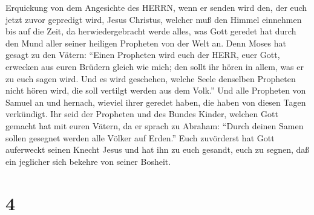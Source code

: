 Erquickung von dem Angesichte des HERRN, wenn er senden wird den, der
euch jetzt zuvor gepredigt wird, Jesus Christus,  welcher
muß den Himmel einnehmen bis auf die Zeit, da herwiedergebracht werde
alles, was Gott geredet hat durch den Mund aller seiner heiligen
Propheten von der Welt an.  Denn Moses hat gesagt zu den
Vätern: ``Einen Propheten wird euch der HERR, euer Gott, erwecken aus
euren Brüdern gleich wie mich; den sollt ihr hören in allem, was er zu
euch sagen wird.  Und es wird geschehen, welche Seele
denselben Propheten nicht hören wird, die soll vertilgt werden aus dem
Volk.''  Und alle Propheten von Samuel an und hernach,
wieviel ihrer geredet haben, die haben von diesen Tagen verkündigt.
 Ihr seid der Propheten und des Bundes Kinder, welchen Gott
gemacht hat mit euren Vätern, da er sprach zu Abraham: ``Durch deinen
Samen sollen gesegnet werden alle Völker auf Erden.''  Euch
zuvörderst hat Gott auferweckt seinen Knecht Jesus und hat ihn zu euch
gesandt, euch zu segnen, daß ein jeglicher sich bekehre von seiner
Bosheit.

\hypertarget{section-3}{%
\section{4}\label{section-3}}

